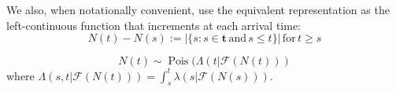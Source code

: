 \documentclass[11pt]{article}
\begin{document}
    We also, when notationally convenient, use the equivalent representation
as the left-continuous function that increments at each arrival time: \[
N(t)-N(s):= \left|\{s:s\in \mathbf{t}\,\mathrm{and}\,s\leq t\}\right| \,\mathrm{ for }\, t\geq s
\]

    \[N(t)\sim \operatorname{Pois}(\Lambda(t|\mathcal{F}(N(t)))\] where
\(\Lambda(s,t|\mathcal{F}(N(t)))=\int_s^t \lambda(s|\mathcal{F}(N(s))).\)



    
    




    
    
\end{document}
